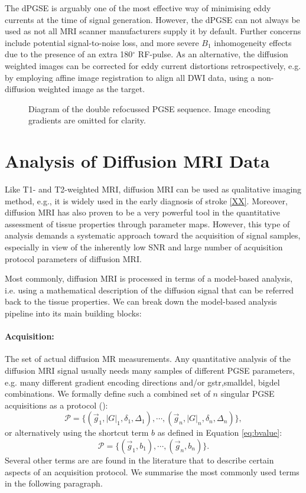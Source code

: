 The \gls{dPGSE} is arguably one of the most effective way of minimising eddy currents at the time of signal generation. However, the \gls{dPGSE} can not always be used as not all MRI scanner manufacturers supply it by default. Further concerns include potential signal-to-noise loss, and more severe $B_1$ inhomogeneity effects due to the presence of an extra 180$^\circ$ \gls{RF}-pulse. As an alternative, the diffusion weighted images can be corrected for eddy current distortions retrospectively, e.g. by employing affine image registration to align all \gls{DWI} data, using a non-diffusion weighted image as the target\citep{Rohde:2003}.


\begin{figure}[ht]
\centering
{}
\caption{Diagram of the double refocussed PGSE sequence. Image encoding gradients are omitted for clarity.}
\label{fig:chapter2 drpgse_diagram}
\end{figure}

\section{Analysis of Diffusion MRI Data}
Like T1- and T2-weighted MRI, diffusion MRI can be used as qualitative imaging method, e.g., it is widely used in the early diagnosis of stroke \ref{XX}. Moreover, diffusion MRI has also proven to be a very powerful tool in the quantitative assessment of tissue properties through parameter maps. However, this type of analysis demands a systematic approach toward the acquisition of signal samples, especially in view of the inherently low SNR and large number of acquisition protocol parameters of diffusion MRI.


Most commonly, diffusion MRI is processed in terms of a model-based analysis, i.e. using a mathematical description of the diffusion signal that can be referred back to the tissue properties. We can break down the model-based analysis pipeline into its main building blocks: 
\paragraph{Acquisition:} The set of actual diffusion MR measurements. Any quantitative analysis of the diffusion MRI signal usually needs many samples of different PGSE parameters, e.g. many different gradient encoding directions and/or \gls{gstr},\gls{smalldel}, \gls{bigdel} combinations. We formally define such a combined set of $n$ singular PGSE acquisitions as a protocol (\prot):
\begin{equation}
	\mathcal{P} = \{(\vec{g}_1,|G|_1,\delta_1,\Delta_1),\cdots,(\vec{g}_n,|G|_n,\delta_n,\Delta_n)\},
\end{equation}
or alternatively using the shortcut term $b$ as defined in Equation \ref{eq:bvalue}:
\begin{equation*}		
	\mathcal{P} = \{(\vec{g}_1,b_1),\cdots,(\vec{g}_n,b_n)\}.
\end{equation*}
Several other terms are are found in the literature that to describe certain aspects of an acquisition protocol. We summarise the most commonly used terms in the following paragraph. 


